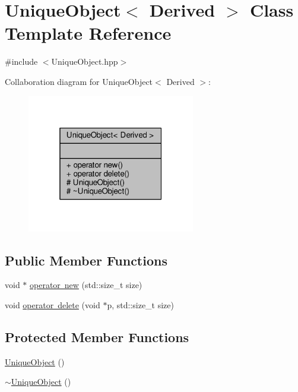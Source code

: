 \hypertarget{class_unique_object}{}\section{Unique\+Object$<$ Derived $>$ Class Template Reference}
\label{class_unique_object}


{\ttfamily \#include $<$Unique\+Object.\+hpp$>$}



Collaboration diagram for Unique\+Object$<$ Derived $>$\+:
\nopagebreak
\begin{figure}[H]
\begin{center}
\leavevmode
\includegraphics[width=208pt]{class_unique_object__coll__graph}
\end{center}
\end{figure}
\subsection*{Public Member Functions}
\begin{DoxyCompactItemize}
\item 
void $\ast$ \mbox{\hyperlink{class_unique_object_acc458556cb9e67a6496d3d2c363202e6}{operator new}} (std\+::size\+\_\+t size)
\item 
void \mbox{\hyperlink{class_unique_object_ae2eb65234b1b3d9574d5e7c8c11be27c}{operator delete}} (void $\ast$p, std\+::size\+\_\+t size)
\end{DoxyCompactItemize}
\subsection*{Protected Member Functions}
\begin{DoxyCompactItemize}
\item 
\mbox{\hyperlink{class_unique_object_abce35af1a7300394a8f0338fb5aec1bb}{Unique\+Object}} ()
\item 
\mbox{\hyperlink{class_unique_object_ae8d2473ec0491d22b29eb05747b492dd}{$\sim$\+Unique\+Object}} ()
\end{DoxyCompactItemize}


